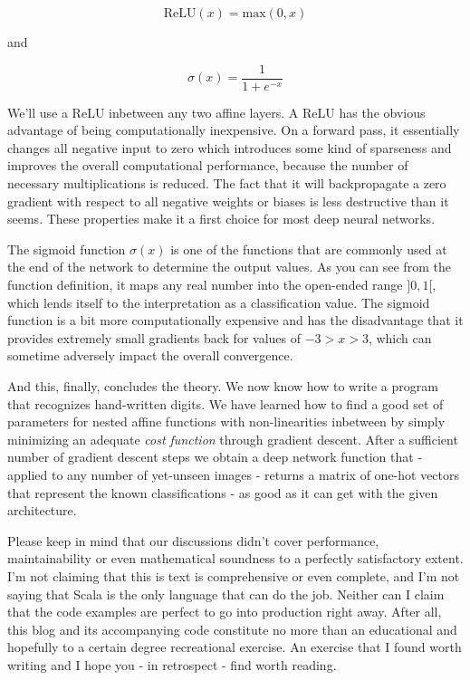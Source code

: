 \documentclass[]{report}
\begin{document}
\begin{equation}
 \text{ReLU}(x) = \text{max}(0, x) 
\end{equation}

and

\begin{equation}
\sigma(x) = \frac{1}{1+e^{-x}} 
\end{equation}

We'll use a ReLU inbetween any two affine layers. A ReLU has the obvious advantage of being computationally inexpensive. On a forward pass, it essentially changes all negative input to zero which introduces some kind of sparseness and improves the overall computational performance, because the number of necessary multiplications is reduced. The fact that it will backpropagate a zero gradient with respect to all negative weights or biases is less destructive than it seems. These properties make it a first choice for most deep neural networks. 

The sigmoid function \(\sigma(x) \) is one of the functions that are commonly used at the end of the network to determine the output values. As you can see from the function definition, it maps any real number into the open-ended range \(]0, 1[ \), which lends itself to the interpretation as a classification value. The sigmoid function is a bit more computationally expensive and has the disadvantage that it provides extremely small gradients back for values of \( -3 > x > 3\), which can sometime adversely impact the overall convergence.

\bigskip

And this, finally, concludes the theory. We now know how to write a program that recognizes hand-written digits. We have learned how to find a good set of parameters for nested affine functions with non-linearities inbetween by simply minimizing an adequate \emph{cost function} through gradient descent.
After a sufficient number of gradient descent steps we obtain a deep network function that - applied to any number of yet-unseen images - returns a matrix of one-hot vectors that represent the known classifications - as good as it can get with the given architecture.  

\bigskip


Please keep in mind that our discussions didn't cover performance, maintainability or even mathematical soundness to a perfectly satisfactory extent. I'm not claiming that this is text is comprehensive or even complete, and I'm not saying that Scala is the only language that can do the job. Neither can I claim that the code examples are perfect to go into production right away. After all, this blog and its accompanying code constitute no more than an educational and hopefully to a certain degree recreational exercise. An exercise that I found worth writing and I hope you - in retrospect - find worth reading.
\end{document}
